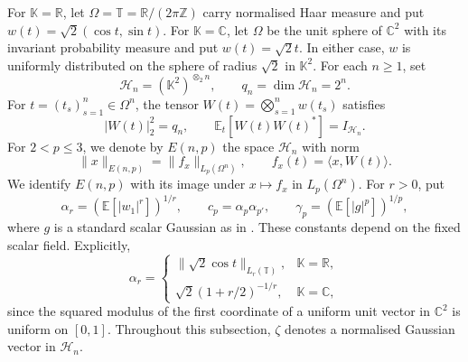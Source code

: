 \documentclass[11pt,a4paper,reqno]{amsart}
\theoremstyle{definition}
\newcommand{\R}{\mathbb R}
\newcommand{\C}{\mathbb C}
\newcommand{\T}{\mathbb T}
\newcommand{\norm}[1]{\lVert #1\rVert}
\numberwithin{equation}{section}
\begin{document}
For $\mathbb K=\R$, let $\Omega=\T=\R/(2\pi\mathbb Z)$ carry normalised Haar measure and put $w(t)=\sqrt2(\cos t,\sin t)$. For $\mathbb K=\C$, let $\Omega$ be the unit sphere of $\C^2$ with its invariant probability measure and put $w(t)=\sqrt2t$. In either case, $w$ is uniformly distributed on the sphere of radius $\sqrt2$ in $\mathbb K^2$. For each $n\geq1$, set
\begin{equation*}
 \mathcal H_n=(\mathbb K^2)^{\otimes_2 n},\qquad q_n=\dim\mathcal H_n=2^n.
\end{equation*}
For $t=(t_s)_{s=1}^n\in\Omega^n$, the tensor $W(t)=\bigotimes_{s=1}^nw(t_s)$ satisfies
\begin{equation}\label{eq:isotropy}
 |W(t)|_2^2=q_n,\qquad \mathbb E_t[W(t)W(t)^*]=I_{\mathcal H_n}.
\end{equation}
For $2<p\leq3$, we denote by $E(n,p)$ the space $\mathcal H_n$ with norm
\begin{equation*}
 \norm{x}_{E(n,p)}=\norm{f_x}_{L_p(\Omega^n)},\qquad f_x(t)=\langle x,W(t)\rangle.
\end{equation*}
We identify $E(n,p)$ with its image under $x\mapsto f_x$ in $L_p(\Omega^n)$. For $r>0$, put
\begin{equation}\label{eq:scalar-constants}
 \alpha_r=(\mathbb E[|w_1|^r])^{1/r},\qquad
 c_p=\alpha_p\alpha_{p'},
 \qquad \gamma_p=(\mathbb E[|g|^p])^{1/p},
\end{equation}
where $g$ is a standard scalar Gaussian as in . These constants depend on the fixed scalar field. Explicitly,
\begin{equation}\label{eq:explicit-alpha}
 \alpha_r=
 \begin{cases}
 \norm{\sqrt2\cos t}_{L_r(\T)},&\mathbb K=\R,\\
 \sqrt2(1+r/2)^{-1/r},&\mathbb K=\C,
 \end{cases}
\end{equation}
since the squared modulus of the first coordinate of a uniform unit vector in $\C^2$ is uniform on $[0,1]$. Throughout this subsection, $\zeta$ denotes a normalised Gaussian vector in $\mathcal H_n$.
\end{document}
